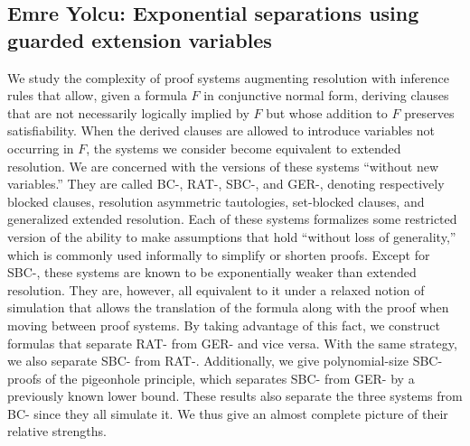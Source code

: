 \documentclass[11pt]{article}
\begin{document}
\subsection*{Emre Yolcu: Exponential separations using guarded extension variables}\label{Yolcu}

We study the complexity of proof systems augmenting resolution with inference rules that allow, given a formula $F$ in conjunctive normal form, deriving clauses that are not necessarily logically implied by $F$ but whose addition to $F$ preserves satisfiability. When the derived clauses are allowed to introduce variables not occurring in $F$, the systems we consider become equivalent to extended resolution. We are concerned with the versions of these systems ``without new variables.'' They are called BC-, RAT-, SBC-, and GER-, denoting respectively blocked clauses, resolution asymmetric tautologies, set-blocked clauses, and generalized extended resolution. Each of these systems formalizes some restricted version of the ability to make assumptions that hold ``without loss of generality,'' which is commonly used informally to simplify or shorten proofs. Except for SBC-, these systems are known to be exponentially weaker than extended resolution. They are, however, all equivalent to it under a relaxed notion of simulation that allows the translation of the formula along with the proof when moving between proof systems. By taking advantage of this fact, we construct formulas that separate RAT- from GER- and vice versa. With the same strategy, we also separate SBC- from RAT-. Additionally, we give polynomial-size SBC- proofs of the pigeonhole principle, which separates SBC- from GER- by a previously known lower bound. These results also separate the three systems from BC- since they all simulate it. We thus give an almost complete picture of their relative strengths.
\end{document}

